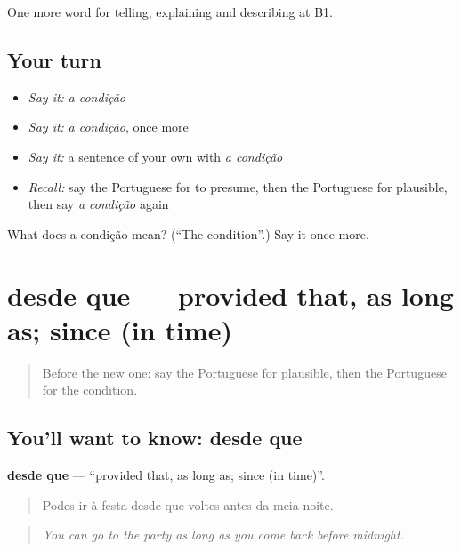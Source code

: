 \begin{grammarlens}[title={What you've built}]
One more word for telling, explaining and describing at B1.
\end{grammarlens}

\subsection*{Your turn}
\begin{itemize}
\raggedright
  \item \emph{Say it:} \emph{a condição}
  \item \emph{Say it:} \emph{a condição}, once more
  \item \emph{Say it:} a sentence of your own with \emph{a condição}
  \item \emph{Recall:} say the Portuguese for to presume, then the Portuguese for plausible, then say \emph{a condição} again
\end{itemize}

\begin{tcolorbox}[breakable,colback=teal!4,colframe=teal!35!black,title={Before you move on}]
What does a condição mean? (\textquotedblleft{}The condition\textquotedblright{}.) Say it once more.
\end{tcolorbox}
\section[desde que]{desde que — provided that, as long as; since (in time)}

\label{lesson:PT-C369-desde-que}



\begin{quote}
Before the new one: say the Portuguese for plausible, then the Portuguese for the condition.
\end{quote}

\subsection*{You'll want to know: desde que}
\textbf{desde que} — \textquotedblleft{}provided that, as long as; since (in time)\textquotedblright{}.

\begin{quote}
Podes ir à festa desde que voltes antes da meia-noite.
\end{quote}

\begin{quote}
\emph{You can go to the party as long as you come back before midnight.}
\end{quote}

